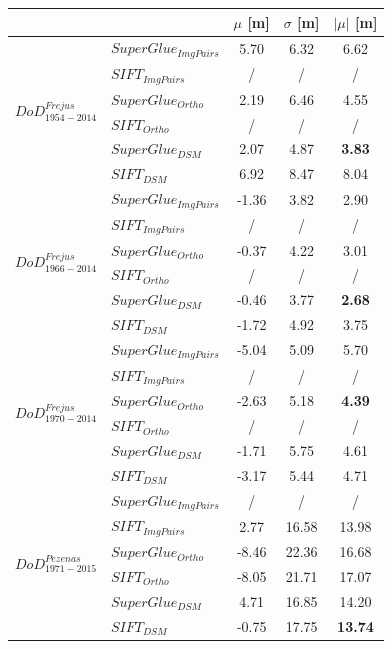 \begin{table}%
	\footnotesize
	\centering
	\begin{tabular}{||l|l|c|c|c||}\hline
		& &$\mu$ [m]&$\sigma$ [m]&$|\mu|$ [m]\\\hline\hline
        \multirow{6}{*}{$DoD^{Frejus}_{1954-2014}$}&${SuperGlue_{ImgPairs}}$ & 5.70 & 6.32 & 6.62\\
&${SIFT_{ImgPairs}}$ & / & / & / \\
&${SuperGlue_{Ortho}}$ & 2.19 & 6.46 & 4.55\\
&${SIFT_{Ortho}}$ & / & / & / \\
&${SuperGlue_{DSM}}$ & 2.07 & 4.87 & \textbf{3.83} \\
&${SIFT_{DSM}}$ & 6.92 & 8.47 & 8.04\\\hline

\multirow{6}{*}{$DoD^{Frejus}_{1966-2014}$}&${SuperGlue_{ImgPairs}}$ & -1.36 & 3.82 & 2.90\\
&${SIFT_{ImgPairs}}$ & / & / & / \\
&${SuperGlue_{Ortho}}$ & -0.37 & 4.22 & 3.01\\
&${SIFT_{Ortho}}$ & / & / & / \\
&${SuperGlue_{DSM}}$ & -0.46 & 3.77 & \textbf{2.68}\\
&${SIFT_{DSM}}$ & -1.72 & 4.92 & 3.75\\\hline

\multirow{6}{*}{$DoD^{Frejus}_{1970-2014}$}&${SuperGlue_{ImgPairs}}$ & -5.04 & 5.09 & 5.70\\
&${SIFT_{ImgPairs}}$ & / & / & / \\
&${SuperGlue_{Ortho}}$ & -2.63 & 5.18 & \textbf{4.39}\\
&${SIFT_{Ortho}}$ & / & / & / \\
&${SuperGlue_{DSM}}$ & -1.71 & 5.75 & 4.61\\
&${SIFT_{DSM}}$ & -3.17 & 5.44 & 4.71\\\hline


\multirow{6}{*}{$DoD^{Pezenas}_{1971-2015}$}&${SuperGlue_{ImgPairs}}$ & / &/ &/ \\
&${SIFT_{ImgPairs}}$ & 2.77 & 16.58 & 13.98\\
&${SuperGlue_{Ortho}}$ & -8.46 & 22.36 & 16.68\\
&${SIFT_{Ortho}}$ & -8.05 & 21.71 & 17.07\\
&${SuperGlue_{DSM}}$ & 4.71 & 16.85 & 14.20\\
&${SIFT_{DSM}}$ & -0.75 & 17.75 & \textbf{13.74}\\\hline


\end{tabular}
\end{table}
